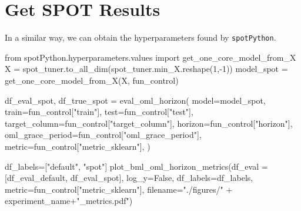 \documentclass[
  letterpaper,
  DIV=11,
  numbers=noendperiod]{scrreprt}
\newenvironment{Shaded}{\begin{snugshade}}{\end{snugshade}}
\newcommand{\DecValTok}[1]{\textcolor[rgb]{0.68,0.00,0.00}{#1}}
\newcommand{\ImportTok}[1]{\textcolor[rgb]{0.00,0.46,0.62}{#1}}
\newcommand{\NormalTok}[1]{\textcolor[rgb]{0.00,0.23,0.31}{#1}}
\newcommand{\OperatorTok}[1]{\textcolor[rgb]{0.37,0.37,0.37}{#1}}
\newcommand{\StringTok}[1]{\textcolor[rgb]{0.13,0.47,0.30}{#1}}
\newcommand{\VariableTok}[1]{\textcolor[rgb]{0.07,0.07,0.07}{#1}}
\begin{document}
\section{Get SPOT Results}\label{get-spot-results}

In a similar way, we can obtain the hyperparameters found by
\texttt{spotPython}.

\begin{Shaded}
\begin{Highlighting}[]
\ImportTok{from}\NormalTok{ spotPython.hyperparameters.values }\ImportTok{import}\NormalTok{ get\_one\_core\_model\_from\_X}
\NormalTok{X }\OperatorTok{=}\NormalTok{ spot\_tuner.to\_all\_dim(spot\_tuner.min\_X.reshape(}\DecValTok{1}\NormalTok{,}\OperatorTok{{-}}\DecValTok{1}\NormalTok{))}
\NormalTok{model\_spot }\OperatorTok{=}\NormalTok{ get\_one\_core\_model\_from\_X(X, fun\_control)}
\end{Highlighting}
\end{Shaded}

\begin{Shaded}
\begin{Highlighting}[]
\NormalTok{df\_eval\_spot, df\_true\_spot }\OperatorTok{=}\NormalTok{ eval\_oml\_horizon(}
\NormalTok{                    model}\OperatorTok{=}\NormalTok{model\_spot,}
\NormalTok{                    train}\OperatorTok{=}\NormalTok{fun\_control[}\StringTok{"train"}\NormalTok{],}
\NormalTok{                    test}\OperatorTok{=}\NormalTok{fun\_control[}\StringTok{"test"}\NormalTok{],}
\NormalTok{                    target\_column}\OperatorTok{=}\NormalTok{fun\_control[}\StringTok{"target\_column"}\NormalTok{],}
\NormalTok{                    horizon}\OperatorTok{=}\NormalTok{fun\_control[}\StringTok{"horizon"}\NormalTok{],}
\NormalTok{                    oml\_grace\_period}\OperatorTok{=}\NormalTok{fun\_control[}\StringTok{"oml\_grace\_period"}\NormalTok{],}
\NormalTok{                    metric}\OperatorTok{=}\NormalTok{fun\_control[}\StringTok{"metric\_sklearn"}\NormalTok{],}
\NormalTok{                )}
\end{Highlighting}
\end{Shaded}

\begin{Shaded}
\begin{Highlighting}[]
\NormalTok{df\_labels}\OperatorTok{=}\NormalTok{[}\StringTok{"default"}\NormalTok{, }\StringTok{"spot"}\NormalTok{]}
\NormalTok{plot\_bml\_oml\_horizon\_metrics(df\_eval }\OperatorTok{=}\NormalTok{ [df\_eval\_default, df\_eval\_spot], log\_y}\OperatorTok{=}\VariableTok{False}\NormalTok{, df\_labels}\OperatorTok{=}\NormalTok{df\_labels, metric}\OperatorTok{=}\NormalTok{fun\_control[}\StringTok{"metric\_sklearn"}\NormalTok{], filename}\OperatorTok{=}\StringTok{"./figures/"} \OperatorTok{+}\NormalTok{ experiment\_name}\OperatorTok{+}\StringTok{"\_metrics.pdf"}\NormalTok{)}
\end{Highlighting}
\end{Shaded}
\end{document}
